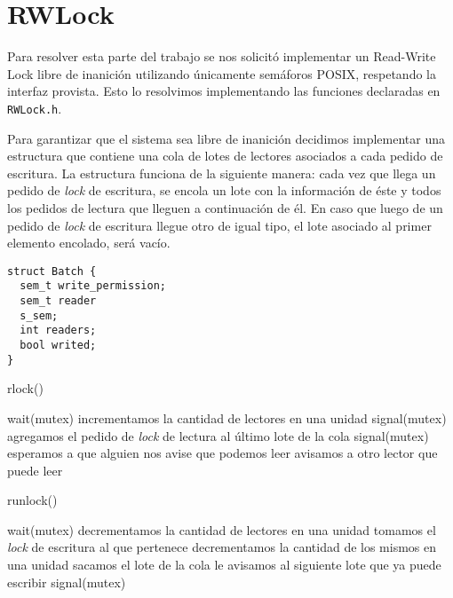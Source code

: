 \section{RWLock}

Para resolver esta parte del trabajo se nos solicitó implementar un Read-Write Lock libre de inanición utilizando
únicamente semáforos POSIX, respetando la interfaz provista. Esto lo resolvimos implementando las funciones declaradas en \verb|RWLock.h|.

	Para garantizar que el sistema sea libre de inanición decidimos implementar una estructura que contiene una cola de lotes de lectores asociados a cada pedido de escritura. 
	La estructura funciona de la siguiente manera: cada vez que llega un pedido de \textit{lock} de escritura, se encola un lote con la información de éste y todos los pedidos de lectura que lleguen a continuación de él. En caso que luego de un pedido de \textit{lock} de escritura llegue otro de igual tipo, el lote asociado al primer  elemento encolado, será vacío.   


\begin{verbatim}
struct Batch {
  sem_t write_permission;
  sem_t reader
  s_sem;
  int readers;
  bool writed;
}
\end{verbatim}
	
\begin{algorithm}[H]
\caption{rlock()}
\begin{algorithmic}[1]
\STATE wait(mutex)
\STATE incrementamos la cantidad de lectores en una unidad
\STATE signal(mutex)
\ELSE
\STATE agregamos el pedido de \textit{lock} de lectura al último lote de la cola
\STATE signal(mutex)
\STATE esperamos a que alguien nos avise que podemos leer 
\STATE avisamos a otro lector que puede leer
\ENDIF
\end{algorithmic}
\end{algorithm}


\begin{algorithm}[H]
\caption{runlock()}
\begin{algorithmic}[1]
\STATE wait(mutex)
\STATE decrementamos la cantidad de lectores en una unidad
	\STATE tomamos el \textit{lock} de escritura al que pertenece
		\STATE decrementamos la cantidad de los mismos en una unidad
	\ENDIF
			\STATE sacamos el lote de la cola
		\ENDIF
			\STATE le avisamos al siguiente lote que ya puede escribir
		\ENDIF
	\ENDIF	 
\ENDIF
\STATE signal(mutex)

\end{algorithmic}
\end{algorithm}

